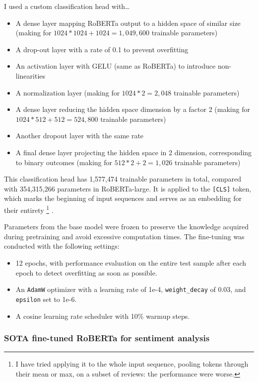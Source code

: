 \documentclass{article}
\begin{document}
I used a custom classification head with… 
\begin{itemize}
    \item A dense layer mapping RoBERTa output to a hidden space of similar size (making for \( 1024*1024+1024=1,049,600 \) trainable parameters)
	\item A drop-out layer with a rate of 0.1 to prevent overfitting
	\item An activation layer with GELU (same as RoBERTa) to introduce non-linearities
	\item A normalization layer (making for \( 1024*2=2,048 \) trainable parameters)
	\item A dense layer reducing the hidden space dimension by a factor 2 (making for \(1024*512+512=524,800\) trainable parameters)
	\item Another dropout layer with the same rate
	\item A final dense layer projecting the hidden space in 2 dimension, corresponding to binary outcomes (making for \(512*2+2=1,026\) trainable parameters)
\end{itemize}
This classification head has 1,577,474 trainable parameters in total, compared with 354,315,266 parameters in RoBERTa-large. It is applied to the \texttt{[CLS]} token, which marks the beginning of input sequences and serves as an embedding for their entirety
\footnote{I have tried applying it to the whole input sequence, pooling tokens through their mean or max, on a subset of reviews: the performance were worse.}
.

Parameters from the base model were frozen to preserve the knowledge acquired during pretraining and avoid excessive computation times. The fine-tuning was conducted with the following settings:
\begin{itemize}
    \item 12 epochs, with performance evaluation on the entire test sample after each epoch to detect overfitting as soon as possible.
	\item An \texttt{AdamW} optimizer with a learning rate of 1e-4, \texttt{weight\_decay} of 0.03, and \texttt{epsilon} set to 1e-6.
    \item A cosine learning rate scheduler with 10\% warmup steps.
\end{itemize}

\subsubsection{SOTA fine-tuned RoBERTa for sentiment analysis}
\end{document}
